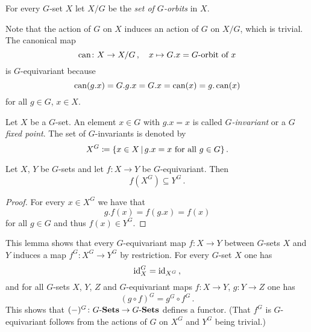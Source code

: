 \begin{definition}
  For every $G$-set $X$ let $X/G$ be the \emph{set of $G$-orbits} in $X$.
\end{definition}


\begin{fluff}
  Note that the action of $G$ on $X$ induces an action of $G$ on $X/G$, which is trivial.
  The canonical map
  \[
            \operatorname{can}
    \colon  X
    \to     X/G \,,
    \quad   x
    \mapsto G.x
    =       \text{$G$-orbit of $x$}
  \]
  is $G$-equivariant because
  \[
      \operatorname{can}(g.x)
    = G.g.x
    = G.x
    = \operatorname{can}(x)
    = g.\operatorname{can}(x)
  \]
  for all $g \in G$, $x \in X$.
\end{fluff}


\begin{definition}
  Let $X$ be a $G$-set.
  An element $x \in G$ with $g.x = x$ is called \emph{$G$-invariant} or a \emph{$G$ fixed point}.
  The set of $G$-invariants is denoted by
  \[
              X^G
    \defined  \{
                x \in X
              \suchthat
                \text{$g.x = x$ for all $g \in G$}
              \} \,.
  \]
\end{definition}


\begin{lemma}
  Let $X$, $Y$ be $G$-sets and let $f \colon X \to Y$ be $G$-equivariant.
  Then
  \[
              f\left( X^G \right)
    \subseteq Y^G \,.
  \]
\end{lemma}


\begin{proof}
  For every $x \in X^G$ we have that
  \[
      g.f(x)
    = f(g.x)
    = f(x)
  \]
  for all $g \in G$ and thus $f(x) \in Y^G$.
\end{proof}


\begin{fluff}
  This lemma shows that every $G$-equivariant map $f \colon X \to Y$ between $G$-sets $X$ and $Y$ induces a map $f^G \colon X^G \to Y^G$ by restriction.
  For every $G$-set $X$ one has
  \[
      \operatorname{id}_X^G
    = \operatorname{id}_{X^G} \,,
  \]
  and for all $G$-sets $X$, $Y$, $Z$ and $G$-equivariant maps $f \colon X \to Y$, $g \colon Y \to Z$ one has
  \[
      (g \circ f)^G
    = g^G \circ f^G \,.
  \]
  This shows that $(-)^G \colon G\text{-}\mathbf{Sets} \to G\text{-}\mathbf{Sets}$ defines a functor.
  (That $f^G$ is $G$-equivariant follows from the actions of $G$ on $X^G$ and $Y^G$ being trivial.)
\end{fluff}


